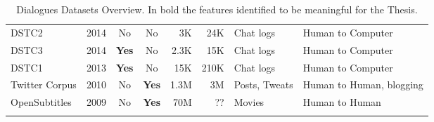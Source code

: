 \begin{landscape}
\begin{longtable}[c]{@{}lcccrrll@{}}
DSTC2                                                                         & 2014                                                    & No           & No                                                     & 3K            & 24K        & Chat logs       & Human to Computer        \\
DSTC3                                                                         & 2014                                                    & \textbf{Yes} & No                                                     & 2.3K          & 15K        & Chat logs       & Human to Computer        \\
DSTC1                                                                         & 2013                                                    & \textbf{Yes} & No                                                     & 15K           & 210K       & Chat logs       & Human to Computer        \\
Twitter Corpus                                                                & 2010                                                    & No           & \textbf{Yes}                                           & 1.3M & 3M         & Posts, Tweats   & Human to Human, blogging \\
OpenSubtitles                                                                 & 2009                                                    & No           & \textbf{Yes}                                           & 70M  & ??         & Movies          & Human to Human           \\* \bottomrule
\caption{Dialogues Datasets Overview. In bold the features identified to be meaningful for the Thesis.}
\label{tab:dialogues_overview_datasets}\\
\end{longtable}
\end{landscape}

